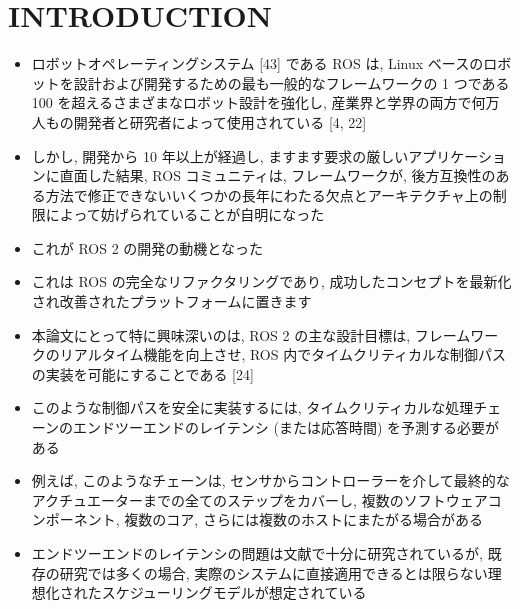 
\section{INTRODUCTION}
\label{sec: introduction}

\begin{frame}{}
    \begin{itemize}
        \item ロボットオペレーティングシステム [43] である ROS は, Linux ベースのロボットを設計および開発するための最も一般的なフレームワークの 1 つである 100 を超えるさまざまなロボット設計を強化し, 産業界と学界の両方で何万人もの開発者と研究者によって使用されている [4, 22]
        \item しかし, 開発から 10 年以上が経過し, ますます要求の厳しいアプリケーションに直面した結果, ROS コミュニティは, フレームワークが, 後方互換性のある方法で修正できないいくつかの長年にわたる欠点とアーキテクチャ上の制限によって妨げられていることが自明になった
    \end{itemize}
\end{frame}

\begin{frame}{}
    \begin{itemize}
        \item これが ROS 2 の開発の動機となった
        \item これは ROS の完全なリファクタリングであり, 成功したコンセプトを最新化され改善されたプラットフォームに置きます
        \item 本論文にとって特に興味深いのは, ROS 2 の主な設計目標は, フレームワークのリアルタイム機能を向上させ, ROS 内でタイムクリティカルな制御パスの実装を可能にすることである [24]
    \end{itemize}
\end{frame}


\begin{frame}{}
    \begin{itemize}
        \item このような制御パスを安全に実装するには, タイムクリティカルな処理チェーンのエンドツーエンドのレイテンシ (または応答時間) を予測する必要がある
        \item 例えば, このようなチェーンは, センサからコントローラーを介して最終的なアクチュエーターまでの全てのステップをカバーし, 複数のソフトウェアコンポーネント, 複数のコア, さらには複数のホストにまたがる場合がある
        \item エンドツーエンドのレイテンシの問題は文献で十分に研究されているが, 既存の研究では多くの場合, 実際のシステムに直接適用できるとは限らない理想化されたスケジューリングモデルが想定されている
    \end{itemize}
\end{frame}

